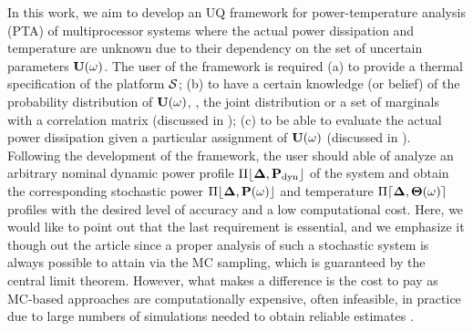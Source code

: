 In this work, we aim to develop an UQ framework for power-temperature analysis (PTA) of multiprocessor systems where the actual power dissipation and temperature are unknown due to their dependency on the set of uncertain parameters $\mathbf{U}(\omega)$. The user of the framework is required (a) to provide a thermal specification of the platform $\mathcal{S}$; (b) to have a certain knowledge (or belief) of the probability distribution of $\mathbf{U}(\omega)$, \eg, the joint distribution or a set of marginals with a correlation matrix (discussed in ); (c) to be able to evaluate the actual power dissipation given a particular assignment of $\mathbf{U}(\omega)$ (discussed in ). Following the development of the framework, the user should able of analyze an arbitrary nominal dynamic power profile $\profPdyn$ of the system and obtain the corresponding stochastic power $\profP{\o}$ and temperature $\profT{\o}$ profiles with the desired level of accuracy and a low computational cost. Here, we would like to point out that the last requirement is essential, and we emphasize it though out the article since a proper analysis of such a stochastic system is always possible to attain via the MC sampling, which is guaranteed by the central limit theorem. However, what makes a difference is the cost to pay as MC-based approaches are computationally expensive, often infeasible, in practice due to large numbers of simulations needed to obtain reliable estimates \cite{xiu2010, maitre2010, diaz-emparanza2002}.

